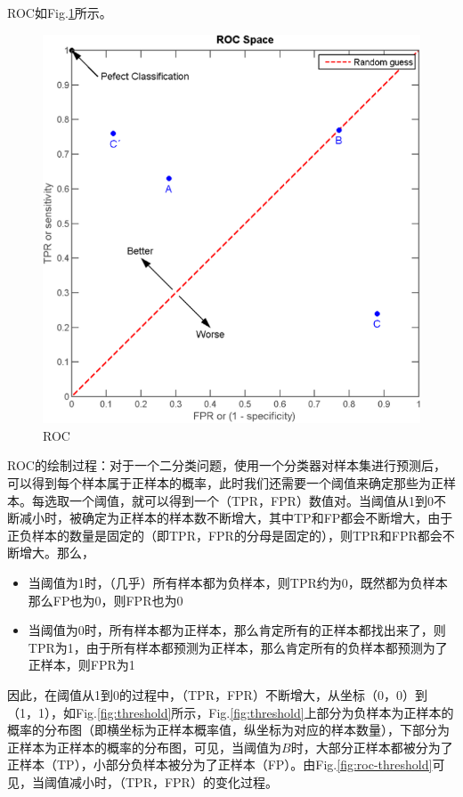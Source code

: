 ROC如Fig.\ref{fig:roc}所示。

\begin{figure}[h]
	\centering
	\includegraphics[width=.6\textwidth]{pics/roc.png}
	\caption{ROC}
	\label{fig:roc}
\end{figure}
ROC的绘制过程：对于一个二分类问题，使用一个分类器对样本集进行预测后，可以得到每个样本属于正样本的概率，此时我们还需要一个阈值来确定那些为正样本。每选取一个阈值，就可以得到一个（TPR，FPR）数值对。当阈值从1到0不断减小时，被确定为正样本的样本数不断增大，其中TP和FP都会不断增大，由于正负样本的数量是固定的（即TPR，FPR的分母是固定的），则TPR和FPR都会不断增大。那么，
\begin{itemize}
	\item 当阈值为1时，（几乎）所有样本都为负样本，则TPR约为0，既然都为负样本那么FP也为0，则FPR也为0
	\item 当阈值为0时，所有样本都为正样本，那么肯定所有的正样本都找出来了，则TPR为1，由于所有样本都预测为正样本，那么肯定所有的负样本都预测为了正样本，则FPR为1
\end{itemize}
因此，在阈值从1到0的过程中，（TPR，FPR）不断增大，从坐标（0，0）到（1，1），如Fig.\ref{fig:threshold}所示，Fig.\ref{fig:threshold}上部分为负样本为正样本的概率的分布图（即横坐标为正样本概率值，纵坐标为对应的样本数量），下部分为正样本为正样本的概率的分布图，可见，当阈值为$B$时，大部分正样本都被分为了正样本（TP），小部分负样本被分为了正样本（FP）。由Fig.\ref{fig:roc-threshold}可见，当阈值减小时，（TPR，FPR）的变化过程。

